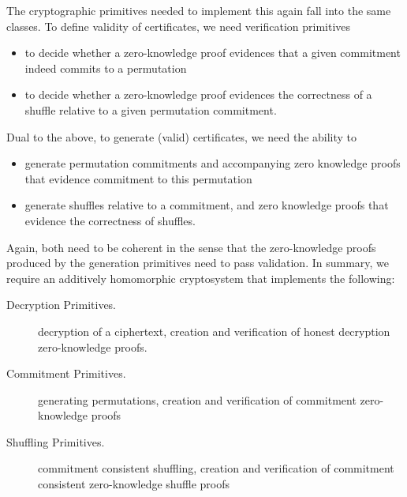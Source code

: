 \noindent
The cryptographic primitives needed to implement this again fall
into the same classes. To define validity of certificates, we need
verification primitives
\begin{itemize}
  \item to decide whether a zero-knowledge proof evidences that a
  given commitment indeed commits to a permutation 
  \item to decide whether a zero-knowledge proof evidences the
  correctness of a shuffle relative to a given permutation
  commitment.
\end{itemize}

\noindent
Dual to the above, to generate (valid) certificates, we need the
ability to
\begin{itemize}
  \item generate permutation commitments and accompanying zero
  knowledge proofs that evidence commitment to this permutation
  \item generate shuffles relative to a commitment, and zero
  knowledge proofs that evidence the correctness of shuffles.
\end{itemize}

\noindent
Again, both need to be coherent in the sense that the zero-knowledge
proofs produced by the generation primitives need to pass
validation. In summary, we require an additively homomorphic
cryptosystem that implements the following:

\begin{description}
\item[Decryption Primitives.]
  decryption of a ciphertext, creation and verification of
 honest decryption zero-knowledge proofs. 

\item[Commitment Primitives.]
  generating permutations, creation and verification of commitment
  zero-knowledge proofs
\item[Shuffling Primitives.]
  commitment consistent shuffling, creation and verification of
  commitment consistent zero-knowledge shuffle proofs 
\end{description}

